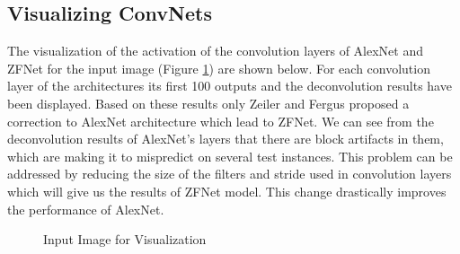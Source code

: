 \documentclass{article} %
\begin{document}
	\subsection{Visualizing ConvNets}
	The visualization of the activation of the convolution layers of AlexNet and ZFNet for the input image (Figure \ref{viz_input}) are shown below. For each convolution layer of the architectures its first 100 outputs and the deconvolution results have been displayed. Based on these results only Zeiler and Fergus proposed a correction to AlexNet architecture which lead to ZFNet. We can see from the deconvolution results of AlexNet's layers that there are block artifacts in them, which are making it to mispredict on several test instances. This problem can be addressed by reducing the size of the filters and stride used in convolution layers which will give us the results of ZFNet model. This change drastically improves the performance of AlexNet.
	
	
	\begin{figure}[!htb]
		\centering
		\caption{Input Image for Visualization}
		\label{viz_input}
	\end{figure}
\end{document}

